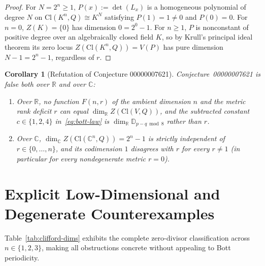 \documentclass[11pt,a4paper]{article}
\newtheorem{corollary}[theorem]{Corollary}
\theoremstyle{definition}
\theoremstyle{remark}
\newcommand{\Cl}{\mathrm{Cl}}
\begin{document}
\begin{proof}
For $N = 2^n \ge 1$, $P(x) := \det(L_x)$ is a homogeneous polynomial of degree $N$ on $\Cl(K^n, Q) \cong K^N$ satisfying $P(1) = 1 \neq 0$ and $P(0) = 0$. For $n = 0$, $Z(K) = \{0\}$ has dimension $0 = 2^0 - 1$. For $n \ge 1$, $P$ is nonconstant of positive degree over an algebraically closed field $K$, so by Krull's principal ideal theorem its zero locus $Z(\Cl(K^n, Q)) = V(P)$ has pure dimension $N - 1 = 2^n - 1$, regardless of $r$.
\end{proof}

\begin{corollary}[Refutation of Conjecture 00000007621]\label{cor:refutation}
Conjecture~00000007621 is false both over $\mathbb{R}$ and over $\mathbb{C}$:
\begin{enumerate}
\setlength{\itemsep}{2pt}\setlength{\parskip}{0pt}
\item[(a)] Over $\mathbb{R}$, no function $F(n, r)$ of the ambient dimension $n$ and the metric rank deficit $r$ can equal $\dim_{\mathbb{R}} Z(\Cl(V, Q))$, and the subtracted constant $c \in \{1, 2, 4\}$ in~\eqref{eq:bott-law} is $\dim_{\mathbb{R}} \mathbb{D}_{p-q \bmod 8}$ rather than $r$.
\item[(b)] Over $\mathbb{C}$, $\dim_{\mathbb{C}} Z(\Cl(\mathbb{C}^n, Q)) = 2^n - 1$ is strictly independent of $r \in \{0, \dots, n\}$, and its codimension $1$ disagrees with $r$ for every $r \neq 1$ (in particular for every nondegenerate metric $r = 0$).
\end{enumerate}
\end{corollary}

\section{Explicit Low-Dimensional and Degenerate Counterexamples}

Table~\ref{tab:clifford-dims} exhibits the complete zero-divisor classification across $n \in \{1, 2, 3\}$, making all obstructions concrete without appealing to Bott periodicity.
\end{document}
